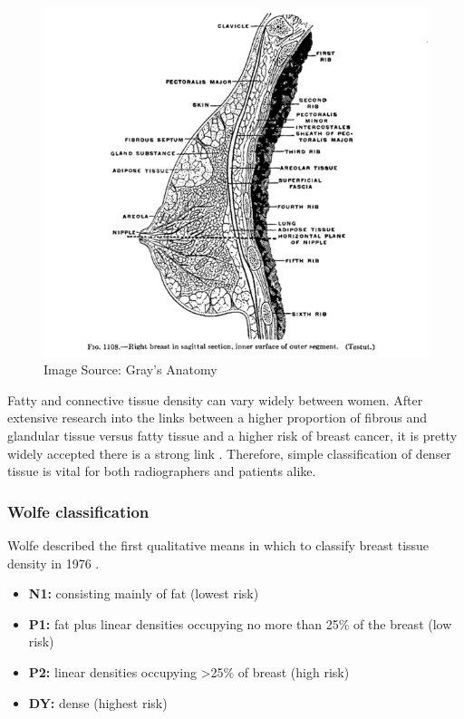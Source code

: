 \begin{figure}[!h]
  \center
  \includegraphics[scale=0.4]{Chapter1/background-img/breast_anatomy.png}
  \caption{Image Source: Gray's Anatomy \cite{Gray_1907}}
  \label{fig:breast-anatomy}
\end{figure}

Fatty and connective tissue density can vary widely between women. After extensive research into the links between a higher proportion of fibrous and glandular tissue versus fatty tissue and a higher risk of breast cancer, it is pretty widely accepted there is a strong link \cite{Boyd_Byng_Jong_Fishell_Little_Miller_Lockwood_Tritchler_Yaffe_1995} . Therefore, simple classification of denser tissue is vital for both radiographers and patients alike.

\subsubsection{Wolfe classification}

Wolfe described the first qualitative means in which to classify breast tissue density in 1976 \cite{Wolfe_1976}.

\begin{itemize}
    \item \textbf{N1:} consisting mainly of fat (lowest risk)
    \item \textbf{P1:} fat plus linear densities occupying no more than 25\% of the breast (low risk)
    \item \textbf{P2:} linear densities occupying \textgreater 25\% of breast (high risk)
    \item \textbf{DY:} dense (highest risk)
\end{itemize}

